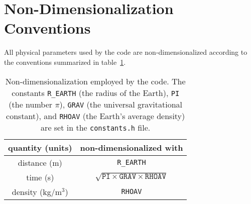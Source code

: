\documentclass[onecolumn]{article}
\begin{document}
\section{Non-Dimensionalization Conventions}
\label{appendix:conventions}

All physical parameters used by the code are non-dimensionalized according
to the conventions summarized in table~\ref{table:conventions}.
\begin{table}[h]
\begin{tabular}{|c|c|} \hline
quantity (units) & non-dimensionalized with \\ \hline
distance (m) & \texttt{R\_EARTH} \\
time (s) & $\sqrt{\texttt{PI}\times\texttt{GRAV}\times\texttt{RHOAV}}$ \\
density (kg/m${}^3$) & \texttt{RHOAV} \\ \hline
\end{tabular}
\caption{
Non-dimensionalization employed by the code. The constants
\texttt{R\_EARTH} (the radius of the Earth),
\texttt{PI} (the number $\pi$), \texttt{GRAV} (the universal gravitational constant),
and \texttt{RHOAV} (the Earth's average density)
are set in the \texttt{constants.h} file.
}
\label{table:conventions}
\end{table}
\end{document}
